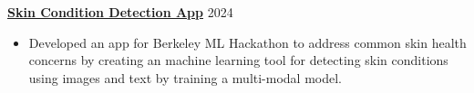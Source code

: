 \textbf{\href{https://devpost.com/software/skin-care}{Skin Condition Detection App}} \hfill 2024 \par
\begin{itemize}
	\item Developed an app for Berkeley ML Hackathon to address common skin health concerns by creating an machine learning tool for detecting skin conditions using images and text by training a multi-modal model.
\end{itemize} \par